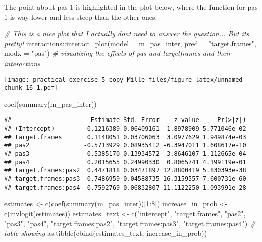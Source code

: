 \documentclass[
]{article}
\newenvironment{Shaded}{\begin{snugshade}}{\end{snugshade}}
\newcommand{\AttributeTok}[1]{\textcolor[rgb]{0.77,0.63,0.00}{#1}}
\newcommand{\CommentTok}[1]{\textcolor[rgb]{0.56,0.35,0.01}{\textit{#1}}}
\newcommand{\DecValTok}[1]{\textcolor[rgb]{0.00,0.00,0.81}{#1}}
\newcommand{\FunctionTok}[1]{\textcolor[rgb]{0.00,0.00,0.00}{#1}}
\newcommand{\NormalTok}[1]{#1}
\newcommand{\OtherTok}[1]{\textcolor[rgb]{0.56,0.35,0.01}{#1}}
\newcommand{\SpecialCharTok}[1]{\textcolor[rgb]{0.00,0.00,0.00}{#1}}
\newcommand{\StringTok}[1]{\textcolor[rgb]{0.31,0.60,0.02}{#1}}
\begin{document}
The point about pas 1 is highlighted in the plot below, where the
function for pas 1 is way lower and less steep than the other ones.

\begin{Shaded}
\begin{Highlighting}[]
\CommentTok{\# This is a nice plot that I actually don\textquotesingle{}t need to answer the question... But it\textquotesingle{}s pretty!}
\NormalTok{interactions}\SpecialCharTok{::}\FunctionTok{interact\_plot}\NormalTok{(}\AttributeTok{model =}\NormalTok{ m\_pas\_inter, }\AttributeTok{pred =} \StringTok{"target.frames"}\NormalTok{, }\AttributeTok{modx =} \StringTok{"pas"}\NormalTok{) }\CommentTok{\# visualizing the effects of pas and targetframes and their interactions}
\end{Highlighting}
\end{Shaded}

\texttt{[image: practical\_exercise\_5-copy\_Mille\_files/figure-latex/unnamed-chunk-16-1.pdf]}

\begin{Shaded}
\begin{Highlighting}[]
\FunctionTok{coef}\NormalTok{(}\FunctionTok{summary}\NormalTok{(m\_pas\_inter))}
\end{Highlighting}
\end{Shaded}

\begin{verbatim}
##                      Estimate Std. Error    z value     Pr(>|z|)
## (Intercept)        -0.1216389 0.06409161 -1.8978909 5.771046e-02
## target.frames       0.1148051 0.03706063  3.0977629 1.949874e-03
## pas2               -0.5713929 0.08935412 -6.3947011 1.608617e-10
## pas3               -0.5385170 0.13934572 -3.8646107 1.112665e-04
## pas4                0.2015655 0.24990330  0.8065741 4.199119e-01
## target.frames:pas2  0.4471818 0.03471897 12.8800419 5.830393e-38
## target.frames:pas3  0.7486959 0.04588735 16.3159557 7.600731e-60
## target.frames:pas4  0.7592769 0.06832807 11.1122250 1.093991e-28
\end{verbatim}

\begin{Shaded}
\begin{Highlighting}[]
\NormalTok{estimates }\OtherTok{\textless{}{-}} \FunctionTok{c}\NormalTok{(}\FunctionTok{coef}\NormalTok{(}\FunctionTok{summary}\NormalTok{(m\_pas\_inter))[}\DecValTok{1}\SpecialCharTok{:}\DecValTok{8}\NormalTok{])}
\NormalTok{increase\_in\_prob }\OtherTok{\textless{}{-}} \FunctionTok{c}\NormalTok{(}\FunctionTok{invlogit}\NormalTok{(estimates))}
\NormalTok{estimates\_text }\OtherTok{\textless{}{-}} \FunctionTok{c}\NormalTok{(}\StringTok{"intercept"}\NormalTok{, }\StringTok{"target.frames"}\NormalTok{, }\StringTok{"pas2"}\NormalTok{, }\StringTok{"pas3"}\NormalTok{, }\StringTok{"pas4"}\NormalTok{, }\StringTok{"target.frames:pas2"}\NormalTok{, }\StringTok{"target.frames:pas3"}\NormalTok{, }\StringTok{"target.frames:pas4"}\NormalTok{)}
\CommentTok{\# table showing }
\FunctionTok{as.tibble}\NormalTok{(}\FunctionTok{cbind}\NormalTok{(estimates\_text, increase\_in\_prob))}
\end{Highlighting}
\end{Shaded}
\end{document}

